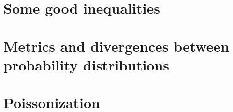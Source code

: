 \documentclass[biber,plain]{nowfnt} %
\begin{document}
\appendix

\chapter{Some good inequalities}
  \label{app:inequalities}


\chapter{Metrics and divergences between probability distributions}
  \label{app:distances}


\chapter{Poissonization}
  \label{app:poissonization}


\backmatter  %

\printbibliography
\end{document}
